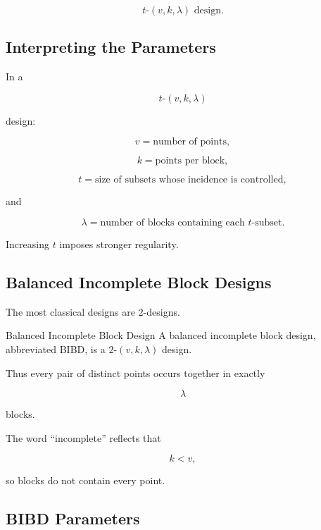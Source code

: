 \[
\boxed{
t\text{-}(v,k,\lambda)\text{ design}.
}
\]

\subsection{Interpreting the Parameters}
\label{subsec:interpreting-design-parameters}

In a

\[
t\text{-}(v,k,\lambda)
\]

design:

\[
v
=
\text{number of points},
\]

\[
k
=
\text{points per block},
\]

\[
t
=
\text{size of subsets whose incidence is controlled},
\]

and

\[
\lambda
=
\text{number of blocks containing each }t\text{-subset}.
\]

Increasing \(t\) imposes stronger regularity.

\subsection{Balanced Incomplete Block Designs}
\label{subsec:bibd}

The most classical designs are \(2\)-designs.

\begin{definitionbox}{Balanced Incomplete Block Design}
A balanced incomplete block design, abbreviated BIBD, is a
\(2\)-\((v,k,\lambda)\) design.
\end{definitionbox}

Thus every pair of distinct points occurs together in exactly

\[
\lambda
\]

blocks.

The word ``incomplete'' reflects that

\[
k<v,
\]

so blocks do not contain every point.

\subsection{BIBD Parameters}
\label{subsec:bibd-parameters}

